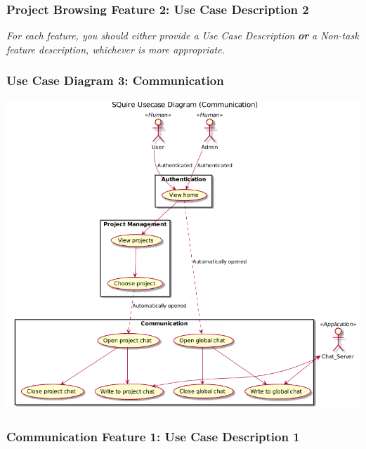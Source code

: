 \documentclass[twoside,letterpaper]{article}
\begin{document}
\subsubsection[Project Browsing Feature 2: Use Case Description 2]{\rmfamily\bfseries\color{black}
	Project Browsing Feature 2: Use Case Description 2}
\hypertarget{RefHeading22059017292}{}
\bigskip

{\color{black}
	\foreignlanguage{english}{\textit{For each feature, you should either provide a Use Case Description
		}}\foreignlanguage{english}{\textbf{\textit{or}}}\foreignlanguage{english}{\textit{ a Non-task feature description,
		whichever is more appropriate.}}}
\newpage

\subsubsection[Use Case Diagram 3: Communication]{\rmfamily\bfseries\color{black}
	Use Case Diagram 3: Communication}

\includegraphics[width=\textwidth]{images/UseCases/Communication}

\newpage

\subsubsection[Communication Feature 1: Use Case Description 1]{\rmfamily\bfseries\color{black}
	Communication Feature 1: Use Case Description 1}
\hypertarget{RefHeading22059017292}{}
\bigskip
\end{document}
